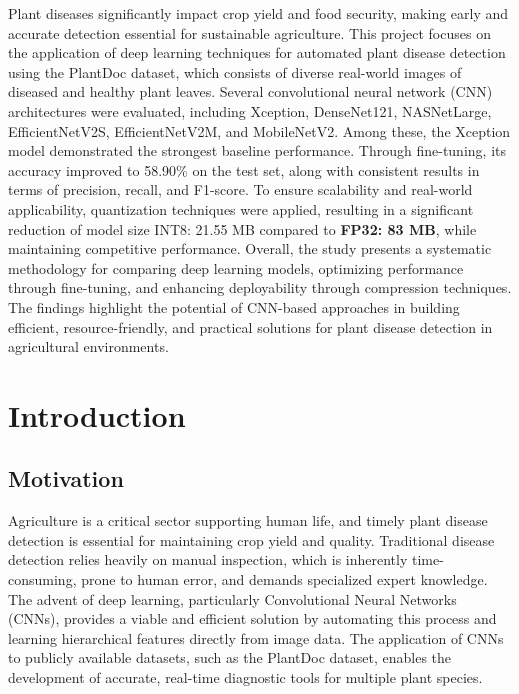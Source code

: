 \documentclass[12pt, a4paper]{report}
\begin{document}
\noindent
\justifying
Plant diseases significantly impact crop yield and food security, making early and accurate detection essential for sustainable agriculture.
This project focuses on the application of deep learning techniques for automated plant disease detection using the PlantDoc dataset, which consists of diverse real-world images of diseased and healthy plant leaves. Several convolutional neural network (CNN) architectures were evaluated, including Xception, DenseNet121, NASNetLarge, EfficientNetV2S, EfficientNetV2M, and MobileNetV2. Among these, the Xception model demonstrated the strongest baseline performance. Through fine-tuning, its accuracy improved to 58.90\% on the test set, along with consistent results in terms of precision, recall, and F1-score. To ensure scalability and real-world applicability, quantization techniques were applied, resulting in a significant reduction of model size INT8: 21.55 MB compared to \textbf{FP32: 83 MB}, while maintaining competitive performance. Overall, the study presents a systematic methodology for comparing deep learning models, optimizing performance through fine-tuning, and enhancing deployability through compression techniques. The findings highlight the potential of CNN-based approaches in building efficient, resource-friendly, and practical solutions for plant disease detection in agricultural environments.

\newpage
\thispagestyle{empty}

\tableofcontents
{}

\newpage
\chapter{Introduction}
\label{chap:intro}

\section{Motivation}
\label{sec:motivation}

Agriculture is a critical sector supporting human life, and timely plant disease detection is essential for maintaining crop yield and quality. Traditional disease detection relies heavily on manual inspection, which is inherently time-consuming, prone to human error, and demands specialized expert knowledge. The advent of deep learning, particularly Convolutional Neural Networks (CNNs), provides a viable and efficient solution by automating this process and learning hierarchical features directly from image data. The application of CNNs to publicly available datasets, such as the PlantDoc dataset, enables the development of accurate, real-time diagnostic tools for multiple plant species.
\end{document}
